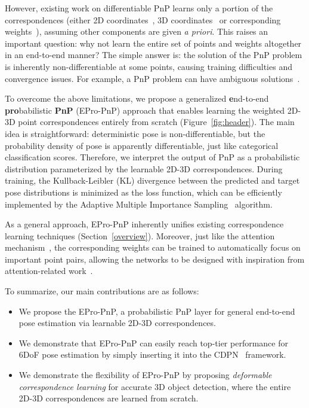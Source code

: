 \documentclass[10pt,twocolumn,letterpaper]{article}
\begin{document}
However, existing work on differentiable PnP learns only a portion of the correspondences (either 2D coordinates~\cite{BPnP}, 3D coordinates~\cite{dsac, dsac++} or corresponding weights~\cite{blindpnp}), assuming other components are given \emph{a priori}. This raises an important question: 
why not learn the entire set of points and weights altogether in an end-to-end manner?
The simple answer is: the solution of the PnP problem is inherently non-differentiable at some points, causing training difficulties and convergence issues. For example, a PnP problem can have ambiguous solutions~\cite{manhardt2019, Schweighofer2006}.


To overcome the above limitations, we propose a generalized \textbf{e}nd-to-end \textbf{pro}babilistic \textbf{PnP} (EPro-PnP) approach that enables learning the weighted 2D-3D point correspondences entirely from scratch (Figure~\ref{fig:header}). The main idea is straightforward: deterministic pose is non-differentiable, but the probability density of pose is apparently differentiable, just like categorical classification scores. Therefore, we interpret the output of PnP as a probabilistic distribution parameterized by the learnable 2D-3D correspondences. During training, the Kullback-Leibler (KL) divergence between the predicted and target pose distributions is minimized as the loss function, which can be efficiently implemented by the Adaptive Multiple Importance Sampling~\cite{amis} algorithm.

As a general approach, EPro-PnP inherently unifies existing correspondence learning techniques (Section~\ref{overview}). Moreover, just like the attention mechanism~\cite{vaswani2017attention}, the corresponding weights can be trained to automatically focus on important point pairs, allowing the networks to be designed with inspiration from attention-related work~\cite{detr,nonlocal,deformabledetr}.


To summarize, our main contributions are as follows: 
\begin{itemize}[noitemsep,topsep=0.7ex,partopsep=0.7ex]
    \item We propose the EPro-PnP, a probabilistic PnP layer for general end-to-end pose estimation via learnable 2D-3D correspondences. 
    \item We demonstrate that EPro-PnP can easily reach top-tier performance for 6DoF pose estimation by simply inserting it into the CDPN~\cite{CDPN} framework.
    \item We demonstrate the flexibility of EPro-PnP by proposing \emph{deformable correspondence learning} for accurate 3D object detection, where the entire 2D-3D correspondences are learned from scratch.
\end{itemize}
\end{document}
